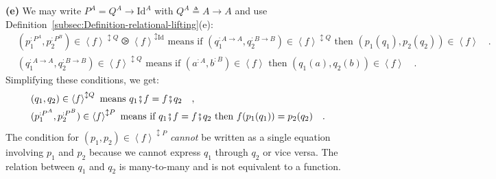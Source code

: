 \textbf{(e)} We may write $P^{A}=Q^{A}\rightarrow\text{Id}^{A}$ with
$Q^{A}\triangleq A\rightarrow A$ and use Definition~\ref{subsec:Definition-relational-lifting}(e):
\begin{align*}
 & (p_{1}^{:P^{A}},p_{2}^{:P^{B}})\in\left<f\right>^{\updownarrow Q}\ogreaterthan\left<f\right>^{\updownarrow\text{Id}}\text{ means if }(q_{1}^{:A\rightarrow A},q_{2}^{:B\rightarrow B})\in\left<f\right>^{\updownarrow Q}\text{ then }(p_{1}(q_{1}),p_{2}(q_{2}))\in\left<f\right>\quad.\\
 & (q_{1}^{:A\rightarrow A},q_{2}^{:B\rightarrow B})\in\left<f\right>^{\updownarrow Q}\text{ means if }(a^{:A},b^{:B})\in\left<f\right>\text{ then }(q_{1}(a),q_{2}(b))\in\left<f\right>\quad.
\end{align*}
Simplifying these conditions, we get:
\begin{align}
 & (q_{1},q_{2})\in\left<f\right>^{\updownarrow Q}\text{ means }q_{1}\bef f=f\bef q_{2}\quad,\nonumber \\
 & (p_{1}^{:P^{A}},p_{2}^{:P^{B}})\in\left<f\right>^{\updownarrow P}\text{ means if }q_{1}\bef f=f\bef q_{2}\text{ then }f(p_{1}(q_{1}))=p_{2}(q_{2})\quad.\label{eq:relational-lifting-example-e-derivation1}
\end{align}
The condition for $(p_{1},p_{2})\in\left<f\right>^{\updownarrow P}$
\emph{cannot} be written as a single equation involving $p_{1}$ and
$p_{2}$ because we cannot express $q_{1}$ through $q_{2}$ or vice
versa. The relation between $q_{1}$ and $q_{2}$ is many-to-many
and is not equivalent to a function.

